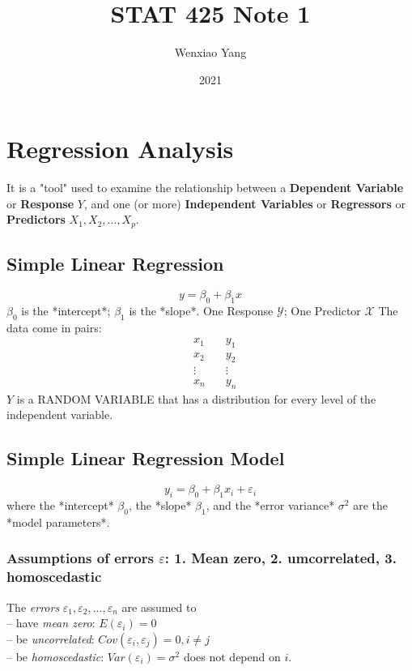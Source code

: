 \documentclass[11pt,a4paper]{article}
\title{STAT 425 Note 1}
\author[*]{Wenxiao Yang}
\affil[*]{Department of Mathematics, University of Illinois at Urbana-Champaign}
\date{2021}
\begin{document}
\maketitle
\tableofcontents
\newpage

\section{Regression Analysis}
It is a "tool" used to examine the relationship between
a \textbf{Dependent Variable} or \textbf{Response} $Y$, and
one (or more) \textbf{Independent Variables} or \textbf{Regressors} or \textbf{Predictors} $X_1 ,X_2 ,...,X_p$.

\subsection{Simple Linear Regression}
$$y=\beta_0+\beta_1 x$$
$\beta_0$ is the *intercept*; $\beta_1$ is the *slope*.
One Response $\mathcal{Y}$; One Predictor $\mathcal{X}$
The data come in pairs:
$$\begin{aligned}
&x_1\quad &y_1\\&x_2\quad &y_2\\&\vdots\quad &\vdots\\&x_n\quad &y_n
\end{aligned}$$
$Y$ is a RANDOM VARIABLE that has a distribution for every level of the independent variable.

\subsection{Simple Linear Regression Model}
$$y_i=\beta_0+\beta_1 x_i+\varepsilon_i $$
where the *intercept* $\beta_0$, the *slope* $\beta_1$, and the *error variance* $\sigma^2$ are the *model parameters*.

\subsubsection{Assumptions of errors $\varepsilon$: 1. Mean zero, 2. umcorrelated, 3. homoscedastic}
The \textit{errors} $\varepsilon_1 , \varepsilon_2 , . . . , \varepsilon_n$ are assumed to\\
– have \textit{mean zero}: $E(\varepsilon_i ) = 0$\\
– be \textit{uncorrelated}: $Cov(\varepsilon_ i , \varepsilon_ j ) = 0, i \neq j$\\
– be \textit{homoscedastic}: $Var(\varepsilon_i ) = \sigma^ 2$ does not depend on $i$.
\end{document}
